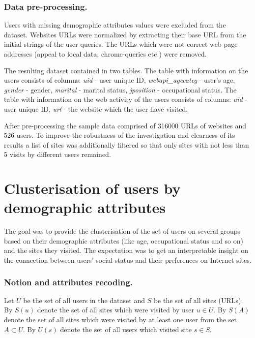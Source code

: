 \documentclass[runningheads,a4paper]{llncs}
\begin{document}
\subsubsection{Data pre-processing.}\label{the-treatment}
Users with missing demographic attributes values were excluded from the dataset. Websites URLs were normalized by extracting their base URL from the initial strings of the user queries. The URLs which were not correct web page addresses (appeal to local data, chrome-queries etc.) were removed. 

The resulting dataset contained in two tables. The table with information on the users consists of columns: \textit{uid} - user unique ID, \textit{webapi\_agecateg} - user's age, \textit{gender} - gender, \textit{marital} - marital status, \textit{jposition} - occupational status. The table with information on the web activity of the users consists of columns: \textit{uid} - user unique ID, \textit{url} - the website which the user have visited.


After pre-processing the sample data comprised of 316000 URLs of websites and 526 users. To improve the robustness of the investigation and clearness of its results a list of sites was additionally filtered so that only sites with not less than 5 visits by different users remained.



\section{Clusterisation of users by demographic attributes}

The goal was to provide the clusterisation of the set of users on several groups based on their demographic attributes (like age, occupational status and so on) and the sites they visited. The expectation was to get an interpretable insight on the connection between users' social status and their preferences on Internet sites. 





\subsubsection{Notion and attributes recoding.}

Let $U$ be the set of all users in the dataset and $S$ be the set of all sites (URLs). By $S(u)$ denote the set of all sites which were visited by user $u \in U$. By $S(A)$ denote the set of all sites which were visited by at least one user from the set $A \subset U$. By $U(s)$ denote the set of all users which visited site $s \in S$.
\end{document}
